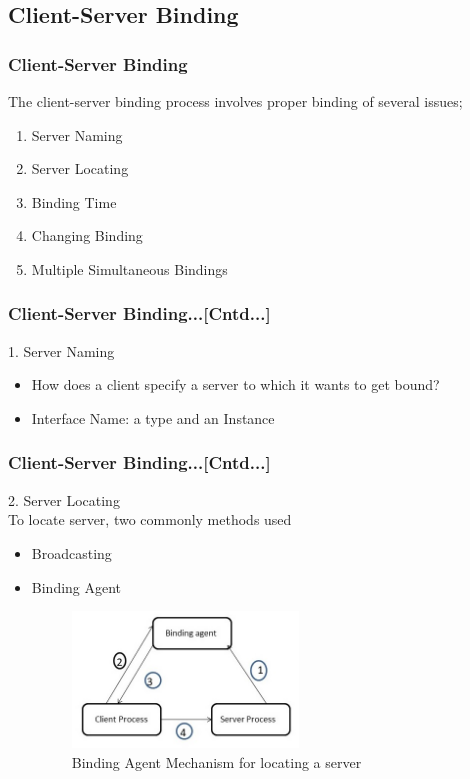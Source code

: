 \documentclass{beamer}
\begin{document}
\subsection{Client-Server Binding}
\begin{frame}
	\frametitle{Client-Server Binding}
	The client-server binding process involves proper binding of several issues;
	\begin{enumerate}
		\item Server Naming
		\item Server Locating
		\item Binding Time
		\item Changing Binding
		\item Multiple Simultaneous Bindings
	\end{enumerate}
	\vspace{3cm}
\end{frame}

\begin{frame}
	\frametitle{Client-Server Binding...[Cntd...]}
	1. Server Naming\\
	\vspace{0.5cm}
	\begin{itemize}
		\item How does a client specify a server to which it wants to get bound?
		\item Interface Name: a type and an Instance
	\end{itemize}
	\vspace{5cm}
\end{frame}


\begin{frame}
	\frametitle{Client-Server Binding...[Cntd...]}
	2. Server Locating\\
	\vspace{0.5cm}
	To locate server, two commonly methods used
	\vspace{0.5cm}
	\begin{itemize}
		\item Broadcasting
		\item Binding Agent
		\begin{figure}
			\centering
			\includegraphics[width=6cm]{fig410.jpg}
			\caption{Binding Agent Mechanism for locating a server}
		\end{figure}
	\end{itemize}
\end{frame}
\end{document}
